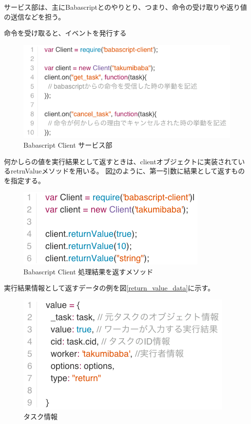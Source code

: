 サービス部は、主にBabascriptとのやりとり、つまり、命令の受け取りや返り値の送信などを担う。

命令を受け取ると、イベントを発行する

\begin{figure}[htbp]
  \begin{center}
  \includegraphics[width=.8\linewidth,bb=0 0 560 253]{images/babascript_client_service.js.png}
  \end{center}
  \caption{Babascript Client サービス部}
  \label{fig:babascript_client_service}
\end{figure}

何かしらの値を実行結果として返すときは、clientオブジェクトに実装されているretrnValueメソッドを用いる。
図\ref{fig:babascript_client_service_returnvalue}のように、第一引数に結果として返すものを指定する。

\begin{figure}[htbp]
  \begin{center}
  \includegraphics[width=.8\linewidth,bb=0 0 357 149]{images/babascript_client_service_returnvalue.js.png}
  \end{center}
  \caption{Babascript Client 処理結果を返すメソッド}
  \label{fig:babascript_client_service_returnvalue}
\end{figure}

実行結果情報として返すデータの例を図\ref{return_value_data}に示す。

\begin{figure}[htbp]
  \begin{center}
  \includegraphics[width=.6\linewidth,bb=0 0 408 225]{images/return_value_data.js.png}
  \end{center}
  \caption{タスク情報}
  \label{fig:return_value_data}
\end{figure}

